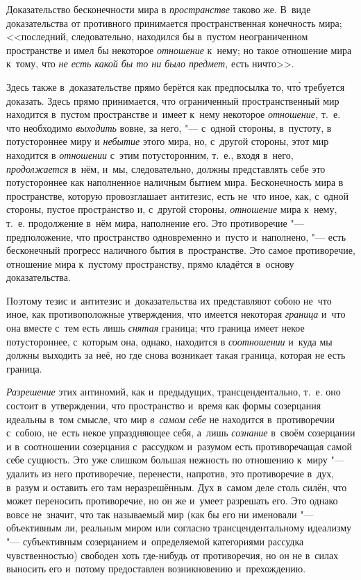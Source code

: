 Доказательство бесконечности мира в {\em пространстве} таково же. В~виде
доказательства от противного принимается пространственная конечность мира;
<<последний, следовательно, находился бы в~пустом неограниченном пространстве
и имел бы некоторое {\em отношение} к~нему; но такое отношение мира к~тому, что
{\em не есть какой бы то ни было предмет,} есть ничто>>.

Здесь также в~доказательстве прямо берётся как предпосылка то, чт\'{о} требуется
доказать. Здесь прямо принимается, что ограниченный пространственный мир
находится в~пустом пространстве и~имеет к~нему некоторое {\em отношение,} т.~е.
что необходимо {\em выходить} вовне, за него, "--- с~одной стороны, в~пустоту,
в потустороннее миру и {\em небытие} этого мира, но, с~другой стороны, этот мир
находится в {\em отношении} с~этим потусторонним, т.~е., входя в~него,
{\em продолжается} в~нём, и~мы, следовательно, должны представлять себе это
потустороннее как наполненное наличным бытием мира. Бесконечность мира в
пространстве, которую провозглашает антитезис, есть не~что иное, как, с~одной
стороны, пустое пространство и, с~другой стороны, {\em отношение} мира к~нему,
т.~е. продолжение в~нём мира, наполнение его. Это противоречие "--- предположение,
что пространство одновременно и~пусто и~наполнено, "--- есть бесконечный прогресс
наличного бытия в~пространстве. Это самое противоречие, отношение мира к~пустому
пространству, прямо кладётся в~основу доказательства.

Поэтому тезис и~антитезис и~доказательства их представляют собою не~что иное,
как противоположные утверждения, что имеется некоторая {\em граница} и~что она
вместе с~тем есть лишь {\em снятая} граница; что граница имеет некое
потустороннее, с~которым она, однако, находится в {\em соотношении} и~куда мы
должны выходить за неё, но где снова возникает такая граница, которая не есть
граница.

{\em Разрешение} этих антиномий, как и~предыдущих, трансцендентально, т.~е. оно
состоит в~утверждении, что пространство и~время как формы созерцания идеальны
в~том смысле, что мир {\em в~самом себе} не находится в~противоречии с~собою,
не~есть некое упраздняющее себя, а~лишь {\em сознание} в~своём созерцании и
в~соотношении созерцания с~рассудком и~разумом есть противоречащая самой себе
сущность. Это уже слишком большая нежность по отношению к~миру "--- удалить из
него противоречие, перенести, напротив, это противоречие в~дух, в~разум и
оставить его там неразрешённым. Дух в~самом деле столь силён, что может
переносить противоречие, но он же и~умеет разрешать его. Это однако вовсе
не~значит, что так называемый мир (как бы его ни именовали "--- объективным ли,
реальным миром или согласно трансцендентальному идеализму "--- субъективным
созерцанием и~определяемой категориями рассудка чувственностью) свободен хоть
где-нибудь от противоречия, но он не в~силах выносить его и~потому предоставлен
возникновению и~прехождению.

